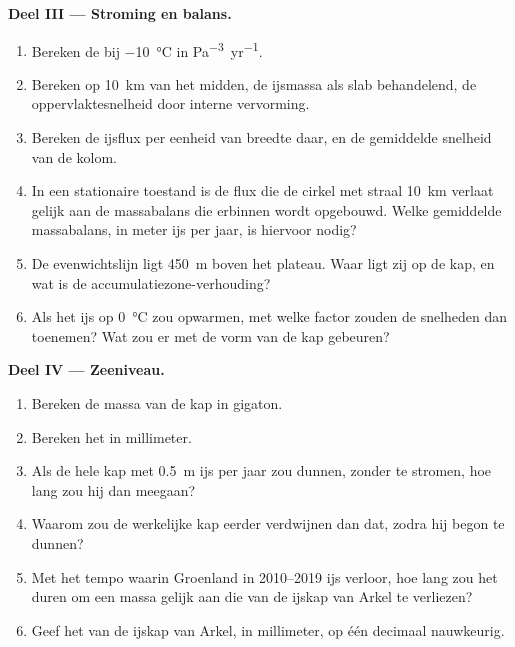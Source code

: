 \begin{problem}
\medskip\noindent\textbf{Deel III --- Stroming en balans.}
\begin{enumerate}[resume]
\item Bereken de  bij \qty{-10}{\celsius} in
  \unit{Pa^{-3}.yr^{-1}}.
\item Bereken op \qty{10}{km} van het midden, de ijsmassa als slab behandelend,
  de oppervlaktesnelheid door interne vervorming.
\item Bereken de ijsflux per eenheid van breedte daar, en de gemiddelde snelheid van
  de kolom.
\item In een stationaire toestand is de flux die de cirkel met straal
  \qty{10}{km} verlaat gelijk aan de massabalans die erbinnen wordt opgebouwd. Welke gemiddelde massabalans, in
  meter ijs per jaar, is hiervoor nodig?
\item De evenwichtslijn ligt \qty{450}{m} boven het plateau. Waar ligt zij
  op de kap, en wat is de accumulatiezone-verhouding?
\item Als het ijs op \qty{0}{\celsius} zou opwarmen, met welke factor zouden de
  snelheden dan toenemen? Wat zou er met de vorm van de kap gebeuren?
\end{enumerate}

\medskip\noindent\textbf{Deel IV --- Zeeniveau.}
\begin{enumerate}[resume]
\item Bereken de massa van de kap in gigaton.
\item Bereken het  in millimeter.
\item Als de hele kap met \qty{0.5}{m} ijs per jaar zou dunnen, zonder te stromen,
  hoe lang zou hij dan meegaan?
\item Waarom zou de werkelijke kap eerder verdwijnen dan dat, zodra hij begon
  te dunnen?
\item Met het tempo waarin Groenland in 2010--2019 ijs verloor, hoe lang zou
  het duren om een massa gelijk aan die van de ijskap van Arkel te verliezen?
\item Geef het  van de ijskap van Arkel, in millimeter,
  op één decimaal nauwkeurig.
\end{enumerate}
\end{problem}
